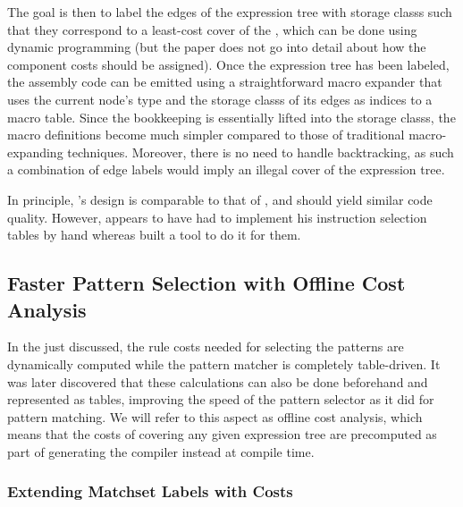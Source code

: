 {The goal is then to label the \glspl{edge} of the \gls{expression tree} with
\glspl{storage class} such that they correspond to a least-cost cover of the
, which can be done using dynamic programming (but the
paper does not go into detail about how the component costs should be
assigned).
%
Once the \gls{expression tree} has been labeled, the \gls{assembly code}
can be emitted using a straightforward \gls{macro expander} that uses the
current \gls{node}'s type and the \glspl{storage class} of its \glspl{edge} as
indices to a macro table.
%
Since the bookkeeping is essentially lifted into the
\glspl{storage class}, the macro definitions become much simpler compared to
those of traditional \gls{macro}-expanding techniques.
%
Moreover, there is no
need to handle backtracking, as such a combination of \gls{edge} labels would
imply an illegal cover of the \gls{expression tree}.

In principle, \citeauthor{Horspool1987}'s design is comparable to that of
\citeauthor{Aho1989}, and should yield similar code quality.
%
However,
\citeauthor{Horspool1987} appears to have had to implement his \gls{instruction
selection} tables by hand whereas \citeauthor{Aho1989} built a tool to do it for
them.


\subsection{Faster Pattern Selection with Offline Cost Analysis}

In the \tDPapproach just discussed, the \gls{rule} costs needed for selecting
the \glspl{pattern} are dynamically computed while the \gls{pattern matcher} is
completely table-driven.
%
It was later discovered that these calculations can
also be done beforehand and represented as tables, improving the speed of the
\gls{pattern selector} as it did for \gls{pattern matching}.
%
We will refer to
this aspect as \gls{offline cost analysis}, which means that the costs of
covering any given \gls{expression tree} are precomputed as part of generating the
\gls{compiler} instead at compile time.


\subsubsection{Extending Matchset Labels with Costs}

}

